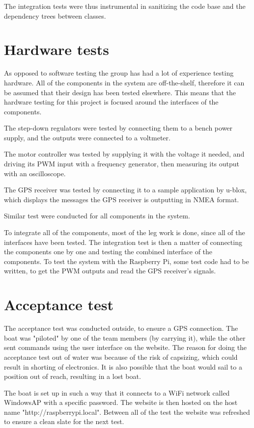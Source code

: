 The integration tests were thus instrumental in sanitizing the code base and the dependency trees between classes.

\section{Hardware tests}
As opposed to software testing the group has had a lot of experience testing hardware. All of the components in the system are off-the-shelf, therefore it can be assumed that their design has been tested elsewhere. This means that the hardware testing for this project is focused around the interfaces of the components.

The step-down regulators were tested by connecting them to a bench power supply, and the outputs were connected to a voltmeter.

The motor controller was tested by supplying it with the voltage it needed, and driving its PWM input with a frequency generator, then measuring its output with an oscilloscope. 

The GPS receiver was tested by connecting it to a sample application by u-blox, which displays the messages the GPS receiver is outputting in NMEA format.

Similar test were conducted for all components in the system. 

To integrate all of the components, most of the leg work is done, since all of the interfaces have been tested. The integration test is then a matter of connecting the components one by one and testing the combined interface of the components. To test the system with the Raspberry Pi, some test code had to be written, to get the PWM outputs and read the GPS receiver's signals.


\section{Acceptance test}
The acceptance test was conducted outside, to ensure a GPS connection. The boat was "piloted" by one of the team members (by carrying it), while the other sent commands using the user interface on the website. The reason for doing the acceptance test out of water was because of the risk of capsizing, which could result in shorting of electronics. It is also possible that the boat would sail to a position out of reach, resulting in a lost boat.

The boat is set up in such a way that it connects to a WiFi network called WindowsAP with a specific password. The website is then hosted on the host name "http://raspberrypi.local". Between all of the test the website was refreshed to ensure a clean slate for the next test.